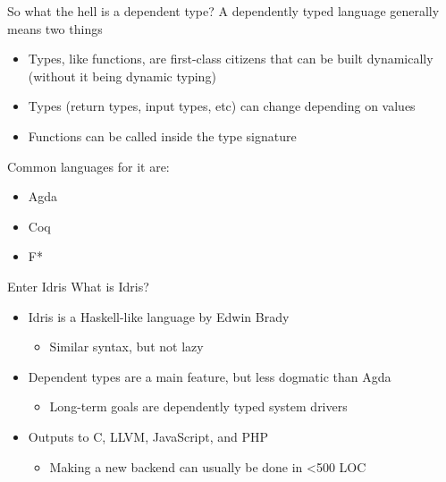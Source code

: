 \documentclass{beamer}
\begin{document}
\begin{frame}{So what the hell is a dependent type? }
 	\transdissolve
	A dependently typed language generally means two things
	\begin{itemize}	
		\pause
		\item Types, like functions, are first-class citizens that can be built dynamically (without it being dynamic typing)
		\pause
		\item Types (return types, input types, etc) can change depending on values
		\pause
                \item Functions can be called inside the type signature
	\end{itemize}
	\pause
	Common languages for it are: 
	\begin{itemize}	
		\item Agda
		\item Coq 
		\item F*
	\end{itemize}
\end{frame}
\begin{frame}{Enter Idris}
	\transdissolve
	What is Idris? 
	\begin{itemize}
		\pause
		\item Idris is a Haskell-like language by Edwin Brady \begin{itemize}
				\item Similar syntax, but not lazy
	\end{itemize}
	\pause
\item Dependent types are a main feature, but less dogmatic than Agda \begin{itemize}
		\item Long-term goals are dependently typed system drivers
	\end{itemize}
		\pause
		\item Outputs to C, LLVM, JavaScript, and PHP \begin{itemize}
				\item Making a new backend can usually be done in \textless 500 LOC
			\end{itemize}
	\end{itemize}
\end{frame}
\end{document}
